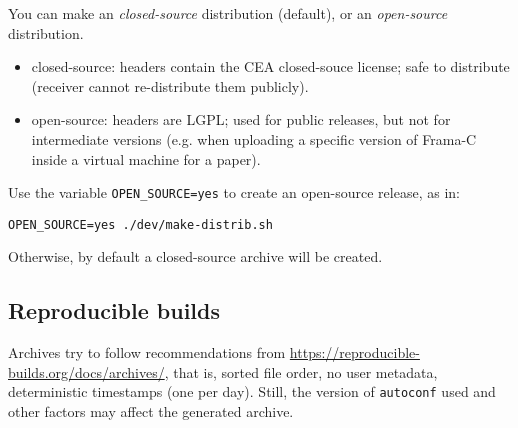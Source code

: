 You can make an {\em closed-source} distribution (default),
or an {\em open-source} distribution.

\begin{itemize}
\item closed-source: headers contain the CEA closed-souce license; safe to
  distribute (receiver cannot re-distribute them publicly).
\item open-source: headers are LGPL; used for public releases, but not for
  intermediate versions (e.g. when uploading a specific version of Frama-C
  inside a virtual machine for a paper).
\end{itemize}

Use the variable \verb+OPEN_SOURCE=yes+ to create an open-source release,
as in:

\verb+OPEN_SOURCE=yes ./dev/make-distrib.sh+

Otherwise, by default a closed-source archive will be created.

\subsection{Reproducible builds}

Archives try to follow recommendations from \url{https://reproducible-builds.org/docs/archives/},
that is, sorted file order, no user metadata, deterministic timestamps
(one per day). Still, the version of \verb+autoconf+ used and other factors
may affect the generated archive.
